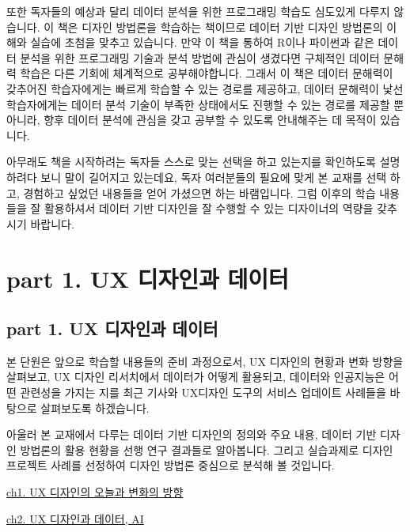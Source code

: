 \documentclass[
  letterpaper,
]{book}
\begin{document}
또한 독자들의 예상과 달리 데이터 분석을 위한 프로그래밍 학습도 심도있게
다루지 않습니다. 이 책은 디자인 방법론을 학습하는 책이므로 데이터 기반
디자인 방법론의 이해와 실습에 초첨을 맞추고 있습니다. 만약 이 책을
통하여 R이나 파이썬과 같은 데이터 분석을 위한 프로그래밍 기술과 분석
방법에 관심이 생겼다면 구체적인 데이터 문해력 학습은 다른 기회에
체계적으로 공부해야합니다. 그래서 이 책은 데이터 문해력이 갖추어진
학습자에게는 빠르게 학습할 수 있는 경로를 제공하고, 데이터 문해력이 낯선
학습자에게는 데이터 분석 기술이 부족한 상태에서도 진행할 수 있는 경로를
제공할 뿐 아니라, 향후 데이터 분석에 관심을 갖고 공부할 수 있도록
안내해주는 데 목적이 있습니다.

아무래도 책을 시작하려는 독자들 스스로 맞는 선택을 하고 있는지를
확인하도록 설명하려다 보니 말이 길어지고 있는데요, 독자 여러분들의
필요에 맞게 본 교재를 선택 하고, 경험하고 싶었던 내용들을 얻어 가셨으면
하는 바램입니다. 그럼 이후의 학습 내용들을 잘 활용하셔서 데이터 기반
디자인을 잘 수행할 수 있는 디자이너의 역량을 갖추시기 바랍니다.

\part{\textbf{part 1. UX 디자인과 데이터}}

\chapter*{part 1. UX 디자인과
데이터}\label{part-1.-ux-uxb514uxc790uxc778uxacfc-uxb370uxc774uxd130-1}


본 단원은 앞으로 학습할 내용들의 준비 과정으로서, UX 디자인의 현황과
변화 방향을 살펴보고, UX 디자인 리서치에서 데이터가 어떻게 활용되고,
데이터와 인공지능은 어떤 관련성을 가지는 지를 최근 기사와 UX디자인
도구의 서비스 업데이트 사례들을 바탕으로 살펴보도록 하겠습니다.

아울러 본 교재에서 다루는 데이터 기반 디자인의 정의와 주요 내용, 데이터
기반 디자인 방법론의 활용 현황을 선행 연구 결과들로 알아봅니다. 그리고
실습과제로 디자인 프로젝트 사례를 선정하여 디자인 방법론 중심으로 분석해
볼 것입니다.

\href{ch1.\%20UX\%20디자인의\%20오늘과\%20변화의\%20방향.qmd}{ch1. UX
디자인의 오늘과 변화의 방향}

\href{ch2.\%20UX\%20디자인과\%20데이터,\%20AI.qmd}{ch2. UX 디자인과
데이터, AI}
\end{document}
